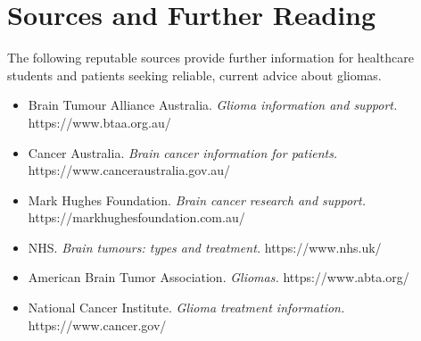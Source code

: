 \section*{Sources and Further Reading}
The following reputable sources provide further information for healthcare students and patients seeking reliable, current advice about gliomas.

\begin{itemize}
    \item Brain Tumour Alliance Australia. \textit{Glioma information and support.} https://www.btaa.org.au/
    \item Cancer Australia. \textit{Brain cancer information for patients.} https://www.canceraustralia.gov.au/
    \item Mark Hughes Foundation. \textit{Brain cancer research and support.} https://markhughesfoundation.com.au/
    \item NHS. \textit{Brain tumours: types and treatment.} https://www.nhs.uk/
    \item American Brain Tumor Association. \textit{Gliomas.} https://www.abta.org/
    \item National Cancer Institute. \textit{Glioma treatment information.} https://www.cancer.gov/
\end{itemize}
